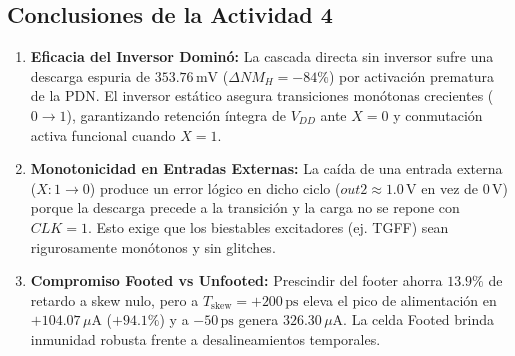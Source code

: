 \subsection{Conclusiones de la Actividad 4}
\begin{enumerate}[leftmargin=1.4em,itemsep=0.0em]
  \item \textbf{Eficacia del Inversor Dominó:} La cascada directa sin inversor sufre una descarga espuria de $353.76\,\text{mV}$ ($\Delta NM_H = -84\%$) por activación prematura de la PDN. El inversor estático asegura transiciones monótonas crecientes ($0 \to 1$), garantizando retención íntegra de $V_{DD}$ ante $X=0$ y conmutación activa funcional cuando $X=1$.
  \item \textbf{Monotonicidad en Entradas Externas:} La caída de una entrada externa ($X: 1 \to 0$) produce un error lógico en dicho ciclo ($out2 \approx 1.0\,\text{V}$ en vez de $0\,\text{V}$) porque la descarga precede a la transición y la carga no se repone con $CLK=1$. Esto exige que los biestables excitadores (ej. TGFF) sean rigurosamente monótonos y sin glitches.
  \item \textbf{Compromiso Footed vs Unfooted:} Prescindir del footer ahorra $13.9\%$ de retardo a skew nulo, pero a $T_{\text{skew}}=+200\,\text{ps}$ eleva el pico de alimentación en $+104.07\,\mu\text{A}$ ($+94.1\%$) y a $-50\,\text{ps}$ genera $326.30\,\mu\text{A}$. La celda Footed brinda inmunidad robusta frente a desalineamientos temporales.
\end{enumerate}
